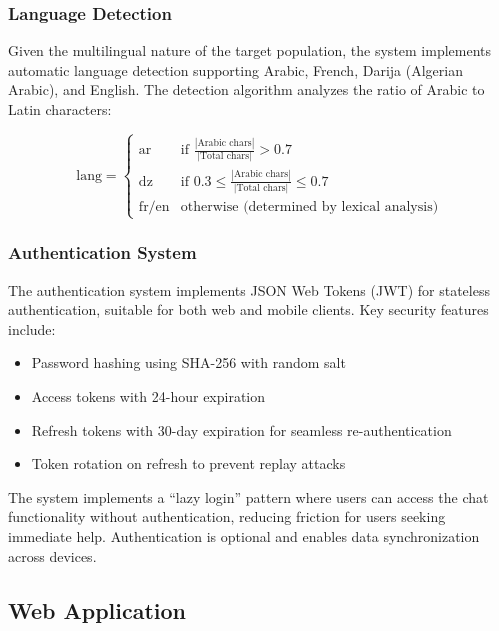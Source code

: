 \subsubsection{Language Detection}

Given the multilingual nature of the target population, the system implements automatic language detection supporting Arabic, French, Darija (Algerian Arabic), and English. The detection algorithm analyzes the ratio of Arabic to Latin characters:

\begin{equation}
\text{lang} = 
\begin{cases}
\text{ar} & \text{if } \frac{|\text{Arabic chars}|}{|\text{Total chars}|} > 0.7 \\
\text{dz} & \text{if } 0.3 \leq \frac{|\text{Arabic chars}|}{|\text{Total chars}|} \leq 0.7 \\
\text{fr/en} & \text{otherwise (determined by lexical analysis)}
\end{cases}
\end{equation}

\subsubsection{Authentication System}

The authentication system implements JSON Web Tokens (JWT) for stateless authentication, suitable for both web and mobile clients. Key security features include:

\begin{itemize}
    \item Password hashing using SHA-256 with random salt
    \item Access tokens with 24-hour expiration
    \item Refresh tokens with 30-day expiration for seamless re-authentication
    \item Token rotation on refresh to prevent replay attacks
\end{itemize}

The system implements a ``lazy login'' pattern where users can access the chat functionality without authentication, reducing friction for users seeking immediate help. Authentication is optional and enables data synchronization across devices.

\subsection{Web Application}


